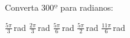 Converta $300º$ para radianos:

$\frac{5\pi}{3}$\,rad
$\frac{2\pi}{3}$\,rad
$\frac{5\pi}{6}$\,rad
$\frac{5\pi}{2}$\,rad
$\frac{11\pi}{6}$\,rad


